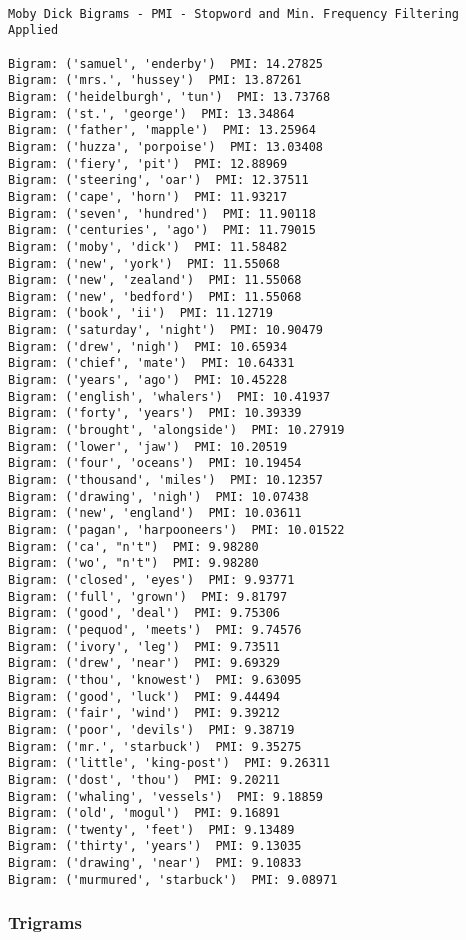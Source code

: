\documentclass[11pt]{article}
\begin{document}
    \begin{Verbatim}[commandchars=\\\{\}]

Moby Dick Bigrams - PMI - Stopword and Min. Frequency Filtering Applied

Bigram: ('samuel', 'enderby')  PMI: 14.27825
Bigram: ('mrs.', 'hussey')  PMI: 13.87261
Bigram: ('heidelburgh', 'tun')  PMI: 13.73768
Bigram: ('st.', 'george')  PMI: 13.34864
Bigram: ('father', 'mapple')  PMI: 13.25964
Bigram: ('huzza', 'porpoise')  PMI: 13.03408
Bigram: ('fiery', 'pit')  PMI: 12.88969
Bigram: ('steering', 'oar')  PMI: 12.37511
Bigram: ('cape', 'horn')  PMI: 11.93217
Bigram: ('seven', 'hundred')  PMI: 11.90118
Bigram: ('centuries', 'ago')  PMI: 11.79015
Bigram: ('moby', 'dick')  PMI: 11.58482
Bigram: ('new', 'york')  PMI: 11.55068
Bigram: ('new', 'zealand')  PMI: 11.55068
Bigram: ('new', 'bedford')  PMI: 11.55068
Bigram: ('book', 'ii')  PMI: 11.12719
Bigram: ('saturday', 'night')  PMI: 10.90479
Bigram: ('drew', 'nigh')  PMI: 10.65934
Bigram: ('chief', 'mate')  PMI: 10.64331
Bigram: ('years', 'ago')  PMI: 10.45228
Bigram: ('english', 'whalers')  PMI: 10.41937
Bigram: ('forty', 'years')  PMI: 10.39339
Bigram: ('brought', 'alongside')  PMI: 10.27919
Bigram: ('lower', 'jaw')  PMI: 10.20519
Bigram: ('four', 'oceans')  PMI: 10.19454
Bigram: ('thousand', 'miles')  PMI: 10.12357
Bigram: ('drawing', 'nigh')  PMI: 10.07438
Bigram: ('new', 'england')  PMI: 10.03611
Bigram: ('pagan', 'harpooneers')  PMI: 10.01522
Bigram: ('ca', "n't")  PMI: 9.98280
Bigram: ('wo', "n't")  PMI: 9.98280
Bigram: ('closed', 'eyes')  PMI: 9.93771
Bigram: ('full', 'grown')  PMI: 9.81797
Bigram: ('good', 'deal')  PMI: 9.75306
Bigram: ('pequod', 'meets')  PMI: 9.74576
Bigram: ('ivory', 'leg')  PMI: 9.73511
Bigram: ('drew', 'near')  PMI: 9.69329
Bigram: ('thou', 'knowest')  PMI: 9.63095
Bigram: ('good', 'luck')  PMI: 9.44494
Bigram: ('fair', 'wind')  PMI: 9.39212
Bigram: ('poor', 'devils')  PMI: 9.38719
Bigram: ('mr.', 'starbuck')  PMI: 9.35275
Bigram: ('little', 'king-post')  PMI: 9.26311
Bigram: ('dost', 'thou')  PMI: 9.20211
Bigram: ('whaling', 'vessels')  PMI: 9.18859
Bigram: ('old', 'mogul')  PMI: 9.16891
Bigram: ('twenty', 'feet')  PMI: 9.13489
Bigram: ('thirty', 'years')  PMI: 9.13035
Bigram: ('drawing', 'near')  PMI: 9.10833
Bigram: ('murmured', 'starbuck')  PMI: 9.08971

    \end{Verbatim}

    \subsubsection{Trigrams}\label{trigrams}
\end{document}
